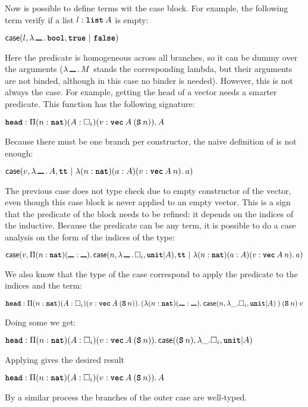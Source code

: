 Now is possible to define terms wit the case block. For example, the following term 
verify if a list $\typing{l}{\app{\Indlist}{A}}$ is empty: 
\newcommand{\noBinder}{\rule{8pt}{1pt}}
\newcommand{\nonLambda}[1]{\ensuremath{\lambda\, \noBinder\,.\,#1}}
\begin{center}
    $\IndElim{l}{\nonLambda{\Indbool}}{\Construe\ |\ \Consfalse}$
\end{center}
Here the predicate is homogeneous across all branches, so it can be dummy over the arguments ($\nonLambda{M}$ 
stands the corresponding lambda, but their arguments are not binded, although in this case no binder is needed).
However, this is not always the case. For example, getting the head of a vector needs a smarter predicate. 
This function has the following signature:
\def\vecHead{\CoqDefinition{head}}
\begin{center}
$\typing{\vecHead}{\depArrow{n}{\Indnat}{A}{\Type}{v}{\app{\Indvec}{A}{(\app{\ConsS}{n})}}{A}}$    
\end{center}
Because there must be one branch per constructor, the naive definition of \vecHead{} is not enough:
\begin{center}
    $\IndElim{v}{\nonLambda{A}}{\Constt\ |\ \abs{n}{\Indnat}{a}{A}{v}{\app{\Indvec}{A}{n}}{a} }$
\end{center}
The previous case does not type check due to empty constructor of the vector, even though this case block 
is never applied to an empty vector. This is a sign that the predicate 
of the block needs to be refined: it depends on the indices of the inductive. Because the predicate can be
any term, it is possible to do a case analysis on the form of the indices of the type:
\begin{center}
    $\IndElim{v}{\depArrow{n}{\Indnat}{\noBinder}{\noBinder}{\IndElim{n}{\nonLambda{\Type}}{\Indunit|A}}}{
             \Constt\ |\ \abs{n}{\Indnat}{a}{A}{v}{\app{\Indvec}{A}{n}}{a}}$
\end{center}
We also know that the type of the case correspond to apply the predicate to the indices and the term:
\begin{center}
$\typing{\vecHead}{\depArrow{n}{\Indnat}{A}{\Type}{v}{\app{\Indvec}{A}{(\app{\ConsS}{n})}}{
        \app{(\abs{n}{\Indnat}{\noBinder}{\noBinder}{
                   \IndElim{n}{\lambda \_.\Type}{\Indunit|A}}}})}{(\app{\ConsS}{n})}{v}$
\end{center}
Doing some \betaRed{} we get:
\begin{center}
$\typing{\vecHead}{\depArrow{n}{\Indnat}{A}{\Type}{v}{\app{\Indvec}{A}{(\app{\ConsS}{n})}}{
                             \IndElim{(\app{\ConsS}{n})}{\lambda \_.\Type}{\Indunit|A}}}$
\end{center}
Applying \iotaRed{} gives the desired result 
\begin{center}
$\typing{\vecHead}{\depArrow{n}{\Indnat}{A}{\Type}{v}{\app{\Indvec}{A}{(\app{\ConsS}{n})}}{A}}$
\end{center}
By a similar process the branches of the outer case are well-typed.

